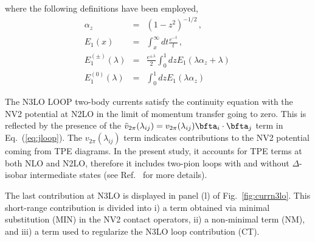 \documentclass[aps,prc,floatfix,showpacs,twocolumn, preprintnumbers]{revtex4-2}
\begin{document}
where the following definitions have been employed,
\begin{eqnarray}
\alpha_z &=& (1-z^2)^{-1/2} \, , \\
E_1(x) &=& \int_x^{\infty} dt \frac{e^{-t}}{t} \, , \\
E_1^{(\pm)}(\lambda) &=& \frac{e^{\pm \lambda}}{2}\int_0^1 dz E_1(\lambda\alpha_z + \lambda) \, \\
E_1^{(0)}(\lambda) &=& \int_0^1 dz E_1(\lambda \alpha_z)
\end{eqnarray}

The N3LO LOOP two-body currents satisfy the continuity equation with the NV2 potential at N2LO in the limit of momentum transfer going to zero. This is reflected by the presence of the $\tilde{v}_{2\pi}(\lambda_{ij}) = v_{2\pi}(\lambda_{ij})\bfta_i\cdot\bfta_j$ term in Eq.~(\ref{eq:jloop}).  The $v_{2\pi}(\lambda_{ij})$ term indicates contributions to the NV2 potential coming from TPE diagrams. In the present study, it accounts for TPE terms at both NLO and N2LO, therefore it includes two-pion loops with and without $\Delta$-isobar intermediate states (see Ref.~\cite{Schiavilla:2018udt} for more details).

The last contribution at N3LO is displayed in panel (l) of Fig.~\ref{fig:currn3lo}. This short-range contribution is divided into i) a term obtained via minimal substitution (MIN) in the NV2 contact operators, ii) a non-minimal term (NM), and iii) a term used to regularize the N3LO loop contribution (CT). 
\end{document}
